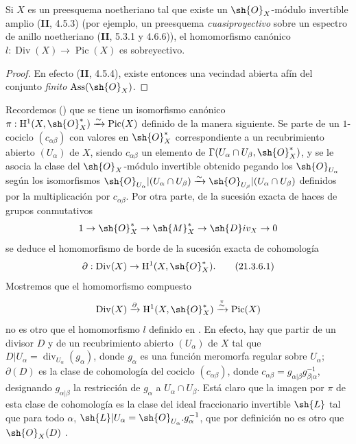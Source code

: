 \begin{corollary}[21.3.5]
\label{IV.21.3.5}
Si $X$ es un preesquema noetheriano tal que existe un $\sh{O}_X$-módulo invertible amplio \textup{(\textbf{II}, 4.5.3)} \textup{(por ejemplo, un preesquema \emph{cuasiproyectivo} sobre un espectro de anillo noetheriano (\textbf{II}, 5.3.1 y 4.6.6))}, el homomorfismo canónico $l:\operatorname{Div}(X)\to\operatorname{Pic}(X)$ es sobreyectivo.
\end{corollary}

\begin{proof}
En efecto (\textbf{II}, 4.5.4), existe entonces una vecindad abierta afín del conjunto \emph{finito} $\operatorname{Ass}(\sh{O}_X)$.
\end{proof}

\begin{remark}[21.3.6]
\label{IV.21.3.6}
Recordemos () que se tiene un isomorfismo canónico $\pi:\mathrm{H}^1(X,\sh{O}_X^*)\xrightarrow{\sim}\operatorname{Pic}(X)$ definido de la manera siguiente.
Se parte de un $1$-cociclo $(c_{\alpha\beta})$ con valores en $\sh{O}_X^*$ correspondiente a un recubrimiento abierto $(U_\alpha)$ de $X$, siendo $c_{\alpha\beta}$ un elemento de $\Gamma(U_\alpha\cap U_\beta,\sh{O}_X^*)$, y se le asocia la clase del $\sh{O}_X$-módulo invertible obtenido pegando los $\sh{O}_{U_\alpha}$ según los isomorfismos $\sh{O}_{U_\alpha}|(U_\alpha\cap U_\beta)\xrightarrow{\sim}\sh{O}_{U_\beta}|(U_\alpha\cap U_\beta)$ definidos por la multiplicación por $c_{\alpha\beta}$.
Por otra parte, de la sucesión exacta de haces de grupos conmutativos
\[
  1\to\sh{O}_X^*\to\sh{M}_X^*\to\sh{D}iv_X\to0
\]
se deduce el homomorfismo de borde de la sucesión exacta de cohomología
\[
\label{IV.21.3.6.1}
  \partial:\operatorname{Div}(X)\to\mathrm{H}^1(X,\sh{O}_X^*).
  \tag{21.3.6.1}
\]
Mostremos que el homomorfismo compuesto
\[
  \operatorname{Div}(X)\xrightarrow{\partial}\mathrm{H}^1(X,\sh{O}_X^*)\xrightarrow{\overset{\pi}{\sim}}\operatorname{Pic}(X)
\]
no es otro que el homomorfismo $l$ definido en .
En efecto, hay que partir de un divisor $D$ y de un recubrimiento abierto $(U_\alpha)$ de $X$ tal que $D|U_\alpha=\operatorname{div}_{U_\alpha}(g_\alpha)$, donde $g_\alpha$ es una función meromorfa regular sobre $U_\alpha$;
$\partial(D)$ es la clase de cohomología del cociclo $(c_{\alpha\beta})$, donde $c_{\alpha\beta}=g_{\alpha|\beta}g_{\beta|\alpha}^{-1}$, designando $g_{\alpha|\beta}$ la restricción de $g_\alpha$ a $U_\alpha\cap U_\beta$.
Está claro que la imagen por $\pi$ de esta clase de cohomología es la clase del ideal fraccionario invertible $\sh{L}$ tal que para todo $\alpha$, $\sh{L}|U_\alpha=\sh{O}_{U_\alpha}.g_\alpha^{-1}$, que por definición no es otro que $\sh{O}_X(D)$ .
\end{remark}
